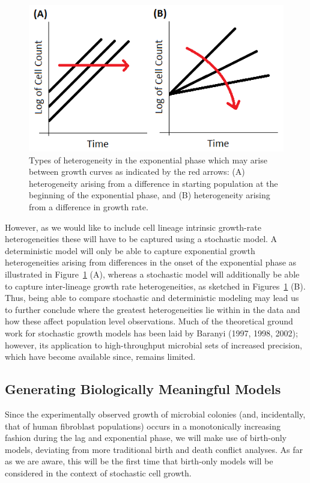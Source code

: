 \documentclass{bioinfo}
\begin{document}
\vspace{-1em}
\begin{figure}[H]
\centering
\includegraphics[width=0.7\linewidth]{HeterogeneityTypes.png}
\caption{Types of heterogeneity in the exponential phase which may arise between growth curves as indicated by the red arrows: (A) heterogeneity arising from a difference in starting population at the beginning of the exponential phase, and (B) heterogeneity arising from a difference in growth rate.}
\label{fig:HeteroTypes}
\vspace{-2em}
\end{figure}

However, as we would like to include cell lineage intrinsic growth-rate heterogeneities these will have to be captured using a stochastic model. A deterministic model will only be able to capture exponential growth heterogeneities arising from differences in the onset of the exponential phase as illustrated in Figure~\ref{fig:HeteroTypes} (A), whereas a stochastic model will additionally be able to capture inter-lineage growth rate heterogeneities, as sketched in Figures~\ref{fig:HeteroTypes}  (B). Thus, being able to compare stochastic and deterministic modeling may lead us to further conclude where the greatest heterogeneities lie within in the data and how these affect population level observations. Much of the theoretical ground work for stochastic growth models has been laid by Baranyi (1997, 1998, 2002); however, its application to high-throughput microbial sets of increased precision, which have become available since, remains limited. 

\subsection{Generating Biologically Meaningful Models}

Since the experimentally observed growth of microbial colonies (and, incidentally, that of human fibroblast populations) occurs in a monotonically increasing fashion during the lag and exponential phase, we will make use of birth-only models, deviating from more traditional birth and death conflict analyses. As far as we are aware, this will be the first time that birth-only models will be considered in the context of stochastic cell growth. 
\end{document}
